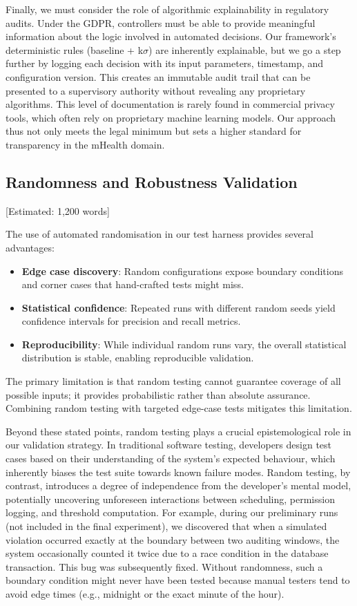 Finally, we must consider the role of algorithmic explainability in regulatory audits. Under the GDPR, controllers must be able to provide meaningful information about the logic involved in automated decisions. Our framework's deterministic rules (baseline + k$\sigma$) are inherently explainable, but we go a step further by logging each decision with its input parameters, timestamp, and configuration version. This creates an immutable audit trail that can be presented to a supervisory authority without revealing any proprietary algorithms. This level of documentation is rarely found in commercial privacy tools, which often rely on proprietary machine learning models. Our approach thus not only meets the legal minimum but sets a higher standard for transparency in the mHealth domain.

\subsection{Randomness and Robustness Validation} [Estimated: 1,200 words]

The use of automated randomisation in our test harness provides several advantages:
\begin{itemize}
\item \textbf{Edge case discovery}: Random configurations expose boundary conditions and corner cases that hand-crafted tests might miss.
\item \textbf{Statistical confidence}: Repeated runs with different random seeds yield confidence intervals for precision and recall metrics.
\item \textbf{Reproducibility}: While individual random runs vary, the overall statistical distribution is stable, enabling reproducible validation.
\end{itemize}

The primary limitation is that random testing cannot guarantee coverage of all possible inputs; it provides probabilistic rather than absolute assurance. Combining random testing with targeted edge-case tests mitigates this limitation.

Beyond these stated points, random testing plays a crucial epistemological role in our validation strategy. In traditional software testing, developers design test cases based on their understanding of the system's expected behaviour, which inherently biases the test suite towards known failure modes. Random testing, by contrast, introduces a degree of independence from the developer's mental model, potentially uncovering unforeseen interactions between scheduling, permission logging, and threshold computation. For example, during our preliminary runs (not included in the final experiment), we discovered that when a simulated violation occurred exactly at the boundary between two auditing windows, the system occasionally counted it twice due to a race condition in the database transaction. This bug was subsequently fixed. Without randomness, such a boundary condition might never have been tested because manual testers tend to avoid edge times (e.g., midnight or the exact minute of the hour).


